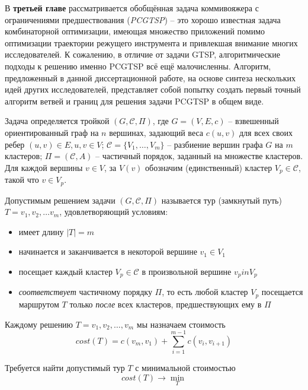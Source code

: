 
В {\bf третьей главе}
рассматривается обобщённая задача коммивояжера с
ограничениями предшествования ({\it PCGTSP}) --
это хорошо известная задача комбинаторной оптимизации,
имеющая множество приложений помимо
оптимизации траектории режущего инструмента
и привлекшая внимание многих исследователей.
К сожалению,
в отличие от задачи GTSP,
алгоритмические подходы к решению
именно PCGTSP всё ещё малочисленны.
Алгоритм, предложенный в данной диссертационной работе,
на основе синтеза нескольких идей других исследователей,
представляет собой попытку
создать первый точный алгоритм
ветвей и границ для
решения задачи PCGTSP в общем виде.

Задача определяется тройкой
$(G,\mathcal C,\Pi)$,
где
$G=(V,E,c)$ -- взвешенный ориентированный граф на $n$
вершинах,
задающий веса $c(u,v)$ для всех своих ребер
$(u,v)\in E, u, v \in V$;
$\mathcal C=\{V_1,\ldots,V_m\}$ -- разбиение вершин
графа $G$ на $m$ кластеров;
$ \Pi = (\mathcal C, A) $ -- частичный порядок,
заданный на множестве кластеров.
Для каждой вершины
$v\in V$, за $V(v)$
обозначим (единственный) кластер
$V_p\in\mathcal C$,
такой что
$v\in V_p$.

Допустимым решением задачи
$(G,\mathcal C,\Pi)$
называется тур (замкнутый путь) $T = v_1, v_2, \dots v_m$,
удовлетворяющий условиям:
\begin{itemize}
    \item
    имеет длину $|T|=m$
    \item
    начинается и заканчивается в некоторой вершине $v_1\in V_1$
    \item
    посещает каждый кластер $V_p\in\mathcal C$ в произвольной вершине $v_p in V_p$
    \item
    \textit{соответствует} частичному порядку $\Pi$,
    то есть любой кластер $V_p$
    посещается маршрутом $T$
    только \textit{после}
    всех кластеров, предшествующих ему в
    $\Pi$
\end{itemize}

Каждому решению
$T=v_1, v_2, \ldots, v_m$
мы назначаем стоимость
\begin{equation}
    \label{eq:pctgsp-cost}
	cost(T) = c(v_m,v_1) + \sum_{i=1}^{m-1} c(v_i,v_{i+1})
\end{equation}

Требуется найти допустимый тур
$ T $
с минимальной стоимостью
$$
cost (T) \to \min_T
$$

